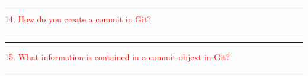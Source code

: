 \documentclass{article}
\begin{document}
\noindent
{\color{red} \rule{\linewidth}{0.5mm}}
\textcolor{red}{14. How do you create a commit in Git?} \\
\noindent
{\color{red} \rule{\linewidth}{0.5mm}}


\noindent
{\color{red} \rule{\linewidth}{0.5mm}}
\textcolor{red}{15. What information is contained in a commit objext in Git?} \\
\noindent
{\color{red} \rule{\linewidth}{0.5mm}}
\end{document}
